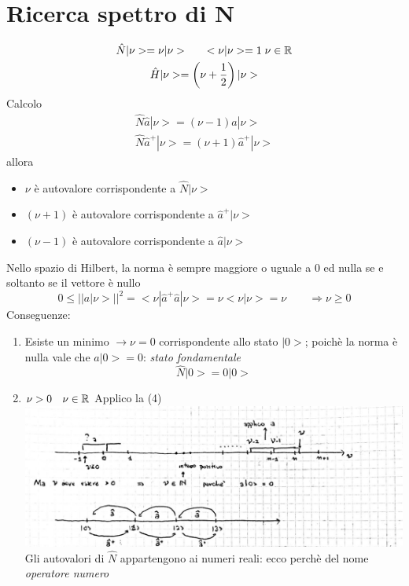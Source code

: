\section{Ricerca spettro di N}

\begin{gather*}
    \hat{N}|\nu> = \nu|\nu> \qquad <\nu|\nu> = 1 \; \nu\in \mathbb{R} \\
    \hat{H}|\nu> = \left(\nu + \frac{1}{2}\right)|\nu>
\end{gather*}
Calcolo
\begin{gather}
    \hat{N}\hat{a}|\nu> = (\nu-1)\hat{a}|\nu>  \tag{4} \\
    \hat{N}\hat{a}^+ |\nu> = (\nu+1) \hat{a}^+|\nu> \tag{5}
\end{gather}
allora
\begin{itemize}
    \item \(\nu\) è autovalore corrispondente a \(\hat{N}|\nu>\)
    \item \((\nu+1)\) è autovalore corrispondente a \(\hat{a}^+|\nu>\)
    \item \((\nu-1)\) è autovalore corrispondente a \(\hat{a}|\nu>\)
\end{itemize}
Nello spazio di Hilbert, la norma è sempre maggiore o uguale a 0 ed nulla se e soltanto se il vettore è nullo
\begin{equation*}
    0 \leq {||a|\nu>||}^2 = <\nu|\hat{a}^+\hat{a}|\nu> = \nu <\nu|\nu> = \nu \qquad \Rightarrow \nu \geq 0
\end{equation*}
Conseguenze:
\begin{enumerate}
    \item Esiste un minimo \(\rightarrow \nu =0\) corrispondente allo stato \(|0>\); poichè la norma è nulla vale che \(a|0> = 0\): \textit{stato fondamentale}
    \begin{equation*}
        \hat{N}|0> = 0|0> 
    \end{equation*}
    \item \(\nu>0 \quad \nu \in \mathbb{R} \) \newline
    Applico la (4) \newline
    \includegraphics[width=\linewidth]{immagini/oscillatore_armonico1.jpg}
    Gli autovalori di \(\hat{N}\) appartengono ai numeri reali: ecco perchè del nome \textit{operatore numero}
\end{enumerate}

